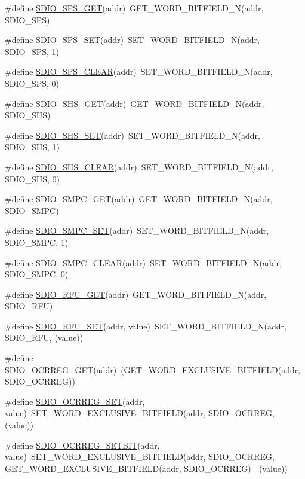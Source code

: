 \begin{DoxyCompactItemize}
\item 
\#define \hyperlink{a00570_a77616cf7fe307b0abe8963844b1465b2}{SDIO\_\-SPS\_\-GET}(addr)~GET\_\-WORD\_\-BITFIELD\_\-N(addr, SDIO\_\-SPS)
\item 
\#define \hyperlink{a00570_ab367c2a8c3b432d5328cde17f70cd453}{SDIO\_\-SPS\_\-SET}(addr)~SET\_\-WORD\_\-BITFIELD\_\-N(addr, SDIO\_\-SPS, 1)
\item 
\#define \hyperlink{a00570_a778aea611b05aa7889303c123fec4e2a}{SDIO\_\-SPS\_\-CLEAR}(addr)~SET\_\-WORD\_\-BITFIELD\_\-N(addr, SDIO\_\-SPS, 0)
\item 
\#define \hyperlink{a00570_af6ad11b27716a01f9a38cb386f08e916}{SDIO\_\-SHS\_\-GET}(addr)~GET\_\-WORD\_\-BITFIELD\_\-N(addr, SDIO\_\-SHS)
\item 
\#define \hyperlink{a00570_ac43eadcb8c484ab4fc01ead857d4d130}{SDIO\_\-SHS\_\-SET}(addr)~SET\_\-WORD\_\-BITFIELD\_\-N(addr, SDIO\_\-SHS, 1)
\item 
\#define \hyperlink{a00570_a9febe39a5f331ae33939e5e79b6d3ce6}{SDIO\_\-SHS\_\-CLEAR}(addr)~SET\_\-WORD\_\-BITFIELD\_\-N(addr, SDIO\_\-SHS, 0)
\item 
\#define \hyperlink{a00570_a092d7c46d49376417a8b49cbab6bc60b}{SDIO\_\-SMPC\_\-GET}(addr)~GET\_\-WORD\_\-BITFIELD\_\-N(addr, SDIO\_\-SMPC)
\item 
\#define \hyperlink{a00570_a817bc979aac0abfd45a40c4bfab0754b}{SDIO\_\-SMPC\_\-SET}(addr)~SET\_\-WORD\_\-BITFIELD\_\-N(addr, SDIO\_\-SMPC, 1)
\item 
\#define \hyperlink{a00570_a977bcbfba55ce6d0919ffe3d813213c9}{SDIO\_\-SMPC\_\-CLEAR}(addr)~SET\_\-WORD\_\-BITFIELD\_\-N(addr, SDIO\_\-SMPC, 0)
\item 
\#define \hyperlink{a00570_abca1e1e5bde5590ded832fa726a70930}{SDIO\_\-RFU\_\-GET}(addr)~GET\_\-WORD\_\-BITFIELD\_\-N(addr, SDIO\_\-RFU)
\item 
\#define \hyperlink{a00570_ac8475d9a298acbf0faacf16bbb0e6386}{SDIO\_\-RFU\_\-SET}(addr, value)~SET\_\-WORD\_\-BITFIELD\_\-N(addr, SDIO\_\-RFU, (value))
\item 
\#define \hyperlink{a00570_a9f479606fcd81de48c0c1ad7571f4410}{SDIO\_\-OCRREG\_\-GET}(addr)~(GET\_\-WORD\_\-EXCLUSIVE\_\-BITFIELD(addr, SDIO\_\-OCRREG))
\item 
\#define \hyperlink{a00570_af73bfe37cac0bd7306b2ea360920b5bf}{SDIO\_\-OCRREG\_\-SET}(addr, value)~SET\_\-WORD\_\-EXCLUSIVE\_\-BITFIELD(addr, SDIO\_\-OCRREG, (value))
\item 
\#define \hyperlink{a00570_a4c9aeb8ed6efdefc2d4c350a12eed58f}{SDIO\_\-OCRREG\_\-SETBIT}(addr, value)~SET\_\-WORD\_\-EXCLUSIVE\_\-BITFIELD(addr, SDIO\_\-OCRREG, GET\_\-WORD\_\-EXCLUSIVE\_\-BITFIELD(addr, SDIO\_\-OCRREG) $|$ (value))

\end{DoxyCompactItemize}
